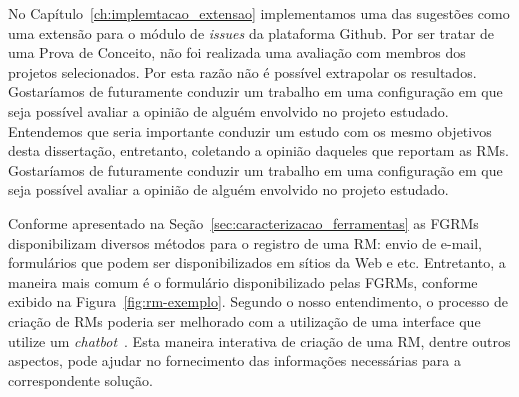 No Capítulo~\ref{ch:implemtacao_extensao} implementamos uma das sugestões como
uma extensão para o módulo de \textit{issues} da plataforma Github. Por ser
tratar de uma Prova de Conceito, não foi realizada uma avaliação com membros dos
projetos selecionados. Por esta razão não é possível extrapolar os resultados.
Gostaríamos de futuramente conduzir um trabalho em uma configuração em que seja
possível avaliar a opinião de alguém envolvido no projeto estudado. Entendemos
que seria importante conduzir um estudo com os mesmo objetivos desta
dissertação, entretanto, coletando a opinião daqueles que reportam as RMs.
Gostaríamos de futuramente conduzir um trabalho em uma configuração em que seja
possível avaliar a opinião de alguém envolvido no projeto estudado.

Conforme apresentado na Seção~\ref{sec:caracterizacao_ferramentas} as FGRMs
disponibilizam diversos métodos para o registro de uma RM\@: envio de e-mail,
formulários que podem ser disponibilizados em sítios da Web e etc. Entretanto, a
maneira mais comum é o formulário disponibilizado pelas FGRMs, conforme exibido
na Figura~\ref{fig:rm-exemplo}. Segundo o nosso entendimento, o processo de
criação de RMs poderia ser melhorado com a utilização de uma interface que
utilize um \textit{chatbot}~\cite{mauldin1994chatterbots,huang2007extracting}.
Esta maneira interativa de criação de uma RM, dentre outros aspectos, pode
ajudar no fornecimento das informações necessárias para a correspondente
solução.
